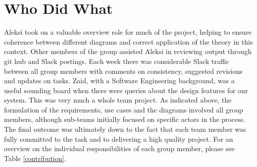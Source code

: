 \section{Who Did What}
Aleksi took on a valuable overview role for much of the project, helping to ensure coherence between different diagrams and correct application of the theory in this context. Other members of the group assisted Aleksi in reviewing output through git hub and Slack postings. Each week there was considerable Slack traffic between all group members with comments on consistency, suggested revisions and updates on tasks. Zaid, with a Software Engineering background, was a useful sounding board when there were queries about the design features for our system. This was very much a whole team project. As indicated above, the formulation of the requirements, use cases and the diagrams involved all group members, although sub-teams initially focused on specific actors in the process. The final outcome was ultimately down to the fact that each team member was fully committed to the task and to delivering a high quality project. For an overview on the individual responsibilities of each group member, please see Table \ref{contribution}.



